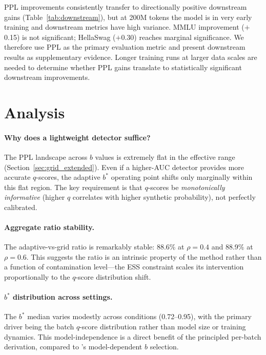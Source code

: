 \documentclass[11pt,a4paper]{article}
\newcommand{\bstar}{b^{*}}
\begin{document}
PPL improvements consistently transfer to directionally positive downstream gains (Table~\ref{tab:downstream}), but at 200M tokens the model is in very early training and downstream metrics have high variance.
MMLU improvement ($+$0.15) is not significant; HellaSwag ($+$0.30) reaches marginal significance.
We therefore use PPL as the primary evaluation metric and present downstream results as supplementary evidence.
Longer training runs at larger data scales are needed to determine whether PPL gains translate to statistically significant downstream improvements.

\section{Analysis}
\label{sec:analysis}

\paragraph{Why does a lightweight detector suffice?}
The PPL landscape across $b$ values is extremely flat in the effective range (Section~\ref{sec:grid_extended}).
Even if a higher-AUC detector provides more accurate $q$-scores, the adaptive $\bstar$ operating point shifts only marginally within this flat region.
The key requirement is that $q$-scores be \emph{monotonically informative} (higher $q$ correlates with higher synthetic probability), not perfectly calibrated.

\paragraph{Aggregate ratio stability.}
The adaptive-vs-grid ratio is remarkably stable: 88.6\% at $\rho{=}0.4$ and 88.9\% at $\rho{=}0.6$.
This suggests the ratio is an intrinsic property of the method rather than a function of contamination level---the ESS constraint scales its intervention proportionally to the $q$-score distribution shift.

\paragraph{$\bstar$ distribution across settings.}
The $\bstar$ median varies modestly across conditions (0.72--0.95), with the primary driver being the batch $q$-score distribution rather than model size or training dynamics.
This model-independence is a direct benefit of the principled per-batch derivation, compared to \citet{drayson2025}'s model-dependent $b$ selection.
\end{document}
